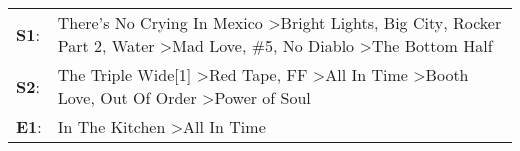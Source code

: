 \begin{supertabular}{p{0.03\textwidth}p{0.92\textwidth}}
 \textbf{S1}:  &  There's No Crying In Mexico\textsuperscript{} \textgreater \enspace Bright Lights, Big City\textsuperscript{}, \enspace Rocker Part 2\textsuperscript{}, \enspace Water\textsuperscript{} \textgreater \enspace Mad Love\textsuperscript{}, \enspace \#5\textsuperscript{}, \enspace No Diablo\textsuperscript{} \textgreater \enspace The Bottom Half\textsuperscript{}  \enspace  \\
 \textbf{S2}:  &                                                The Triple Wide[1]\textsuperscript{} \textgreater \enspace Red Tape\textsuperscript{}, \enspace FF\textsuperscript{} \textgreater \enspace All In Time\textsuperscript{} \textgreater \enspace Booth Love\textsuperscript{}, \enspace Out Of Order\textsuperscript{} \textgreater \enspace Power of Soul\textsuperscript{}  \enspace  \\
 \textbf{E1}:  &                                                                                                                                                                                                                                                                                      In The Kitchen\textsuperscript{} \textgreater \enspace All In Time\textsuperscript{}  \enspace  \\
\end{supertabular}
